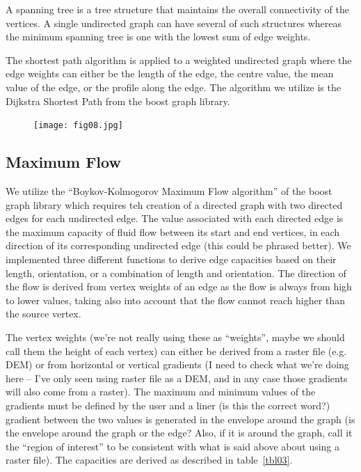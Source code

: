 \documentclass[a4paper,fleqn]{cas-sc}
\begin{document}
A spanning tree is a tree structure that maintains the overall connectivity of the vertices. A single undirected graph can have several of such structures whereas the minimum spanning tree is one with the lowest sum of edge weights. 

The shortest path algorithm is applied to a weighted undirected graph where the edge weights can either be the length of the edge, the centre value, the mean value of the edge, or the profile along the edge. The algorithm we utilize is the Dijkstra Shortest Path from the boost graph library.


\begin{figure}[h]
\centering
	\texttt{[image: fig08.jpg]}
	\caption{}
\label{fig08}
\end{figure}

\subsection{Maximum Flow}
We utilize the ``Boykov-Kolmogorov Maximum Flow algorithm'' of the boost graph library which requires teh creation of a directed graph with two directed edges for each undirected edge. The value associated with each directed edge is the maximum capacity of fluid flow between its start and end vertices, in each direction of its corresponding undirected edge (this could be phrased better). We implemented three different functions to derive edge capacities based on their length, orientation, or a combination of length and orientation. The direction of the flow is derived from vertex weights of an edge as the flow is always from high to lower values, taking also into account that the flow cannot reach higher than the source vertex.  


The vertex weights (we’re not really using these as ``weights'', maybe we should call them the height of each vertex) can either be derived from a raster file (e.g. DEM) or from horizontal or vertical gradients (I need to check what we’re doing here – I’ve only seen using  raster file as a DEM, and in any case those gradients will also come from a raster). The maximum and minimum values of the gradients must be defined by the user and a liner (is this the correct word?) gradient between the two values is generated in the envelope around the graph (is the envelope around the graph or the edge? Also, if it is around the graph, call it the ``region of interest'' to be consistent with what is said above about using a raster file). 
The capacities are derived as described in table~\ref{tbl03}.
\end{document}

